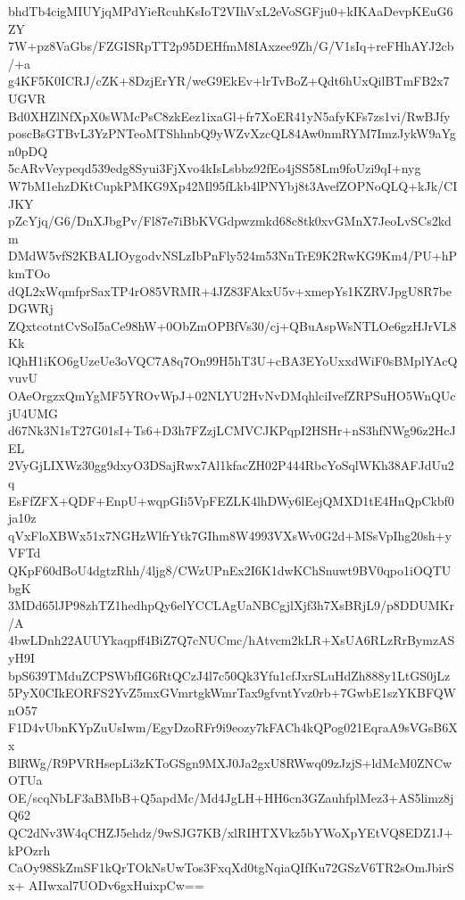 bhdTb4cigMIUYjqMPdYieRcuhKsIoT2VIhVxL2eVoSGFju0+kIKAaDevpKEuG6ZY
7W+pz8VaGbs/FZGISRpTT2p95DEHfmM8IAxzee9Zh/G/V1sIq+reFHhAYJ2cb/+a
g4KF5K0ICRJ/cZK+8DzjErYR/weG9EkEv+lrTvBoZ+Qdt6hUxQilBTmFB2x7UGVR
Bd0XHZlNfXpX0sWMcPsC8zkEez1ixaGl+fr7XoER41yN5afyKFs7zs1vi/RwBJfy
poscBsGTBvL3YzPNTeoMTShhnbQ9yWZvXzcQL84Aw0nmRYM7ImzJykW9aYgn0pDQ
5cARvVeypeqd539edg8Syui3FjXvo4kIsLsbbz92fEo4jSS58Lm9foUzi9qI+nyg
W7bM1ehzDKtCupkPMKG9Xp42Ml95fLkb4lPNYbj8t3AvefZOPNoQLQ+kJk/CIJKY
pZcYjq/G6/DnXJbgPv/Fl87e7iBbKVGdpwzmkd68c8tk0xvGMnX7JeoLvSCs2kdm
DMdW5vfS2KBALIOygodvNSLzIbPnFly524m53NnTrE9K2RwKG9Km4/PU+hPkmTOo
dQL2xWqmfprSaxTP4rO85VRMR+4JZ83FAkxU5v+xmepYs1KZRVJpgU8R7beDGWRj
ZQxtcotntCvSoI5aCe98hW+0ObZmOPBfVs30/cj+QBuAspWsNTLOe6gzHJrVL8Kk
lQhH1iKO6gUzeUe3oVQC7A8q7On99H5hT3U+cBA3EYoUxxdWiF0sBMplYAcQvuvU
OAeOrgzxQmYgMF5YROvWpJ+02NLYU2HvNvDMqhlciIvefZRPSuHO5WnQUcjU4UMG
d67Nk3N1sT27G01sI+Ts6+D3h7FZzjLCMVCJKPqpI2HSHr+nS3hfNWg96z2HcJEL
2VyGjLIXWz30gg9dxyO3DSajRwx7Al1kfacZH02P444RbcYoSqlWKh38AFJdUu2q
EsFfZFX+QDF+EnpU+wqpGIi5VpFEZLK4lhDWy6lEejQMXD1tE4HnQpCkbf0ja10z
qVxFloXBWx51x7NGHzWlfrYtk7GIhm8W4993VXsWv0G2d+MSsVpIhg20sh+yVFTd
QKpF60dBoU4dgtzRhh/4ljg8/CWzUPnEx2I6K1dwKChSnuwt9BV0qpo1iOQTUbgK
3MDd65lJP98zhTZ1hedhpQy6elYCCLAgUaNBCgjlXjf3h7XsBRjL9/p8DDUMKr/A
4bwLDnh22AUUYkaqpff4BiZ7Q7cNUCmc/hAtvcm2kLR+XsUA6RLzRrBymzASyH9I
bpS639TMduZCPSWbfIG6RtQCzJ4l7c50Qk3Yfu1cfJxrSLuHdZh888y1LtGS0jLz
5PyX0CIkEORFS2YvZ5mxGVmrtgkWmrTax9gfvntYvz0rb+7GwbE1szYKBFQWnO57
F1D4vUbnKYpZuUsIwm/EgyDzoRFr9i9eozy7kFACh4kQPog021EqraA9sVGsB6Xx
BlRWg/R9PVRHsepLi3zKToGSgn9MXJ0Ja2gxU8RWwq09zJzjS+ldMcM0ZNCwOTUa
OE/scqNbLF3aBMbB+Q5apdMc/Md4JgLH+HH6cn3GZauhfplMez3+AS5limz8jQ62
QC2dNv3W4qCHZJ5ehdz/9wSJG7KB/xlRIHTXVkz5bYWoXpYEtVQ8EDZ1J+kPOzrh
CaOy98SkZmSF1kQrTOkNsUwTos3FxqXd0tgNqiaQIfKu72GSzV6TR2sOmJbirSx+
AIIwxal7UODv6gxHuixpCw==
